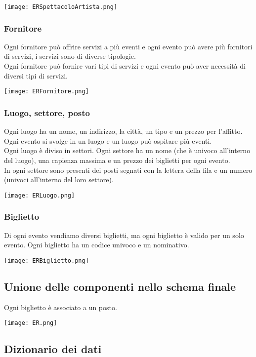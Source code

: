 \documentclass[a4paper,11pt]{article}
\begin{document}
\texttt{[image: ERSpettacoloArtista.png]}

\subsubsection*{Fornitore}

Ogni fornitore può offrire servizi a più eventi e ogni evento può avere più fornitori di servizi, i servizi sono di diverse tipologie.\\
Ogni fornitore può fornire vari tipi di servizi e ogni evento può aver necessità di diversi tipi di servizi.

\texttt{[image: ERFornitore.png]}

\subsubsection*{Luogo, settore, posto}

Ogni luogo ha un nome, un indirizzo, la città, un tipo e un prezzo per l'affitto.
Ogni evento si svolge in un luogo e un luogo può ospitare più eventi.\\
Ogni luogo è diviso in settori.
Ogni settore ha un nome (che è univoco all'interno del luogo), una capienza massima e un prezzo dei biglietti per ogni evento.\\
In ogni settore sono presenti dei posti segnati con la lettera della fila e un numero (univoci all'interno del loro settore).

\texttt{[image: ERLuogo.png]}

\subsubsection*{Biglietto}

Di ogni evento vendiamo diversi biglietti, ma ogni biglietto è valido per un solo evento.
Ogni biglietto ha un codice univoco e un nominativo.

\texttt{[image: ERBiglietto.png]}

\subsection{Unione delle componenti nello schema finale}

Ogni biglietto è associato a un posto.

\texttt{[image: ER.png]}

\subsection{Dizionario dei dati}
\end{document}
